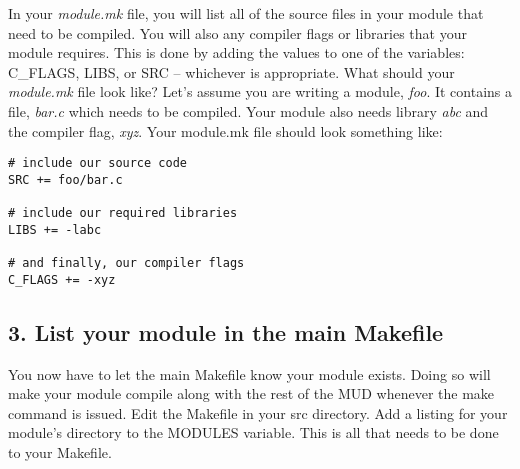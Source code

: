 \documentclass[fignum,doc]{article}
\begin{document}
\begin{doublespace}
In your {\it module.mk} file, you will list all of the source files in your module that need to be compiled. You will also any compiler flags or libraries that your module requires. This is done by adding the values to one of the variables: C\_FLAGS, LIBS, or SRC -- whichever is appropriate. What should your {\it module.mk} file look like? Let's assume you are writing a module, {\it foo}. It contains a file, {\it bar.c} which needs to be compiled. Your module also needs library {\it abc} and the compiler flag, {\it xyz}. Your module.mk file should look something like:

\begin{singlespace} \begin{verbatim}
# include our source code
SRC += foo/bar.c

# include our required libraries
LIBS += -labc

# and finally, our compiler flags
C_FLAGS += -xyz
\end{verbatim} \end{singlespace}



\subsection{3. List your module in the main Makefile}
You now have to let the main Makefile know your module exists. Doing so will make your module compile along with the rest of the MUD whenever the make command is issued. Edit the Makefile in your src directory. Add a listing for your module's directory to the MODULES variable. This is all that needs to be done to your Makefile.




\end{doublespace}
\end{document}
